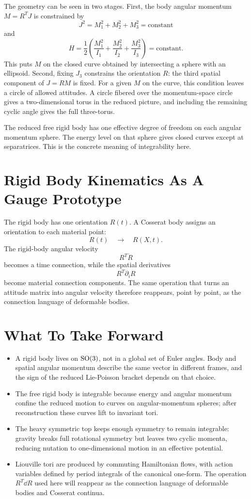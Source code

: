 The geometry can be seen in two stages. First, the body angular momentum
\(M=R^TJ\) is constrained by
\[
  J^2=M_1^2+M_2^2+M_3^2=\text{constant}
\]
and
\[
  H=\frac12\left(\frac{M_1^2}{I_1}
  +\frac{M_2^2}{I_2}
  +\frac{M_3^2}{I_3}\right)=\text{constant}.
\]
This puts \(M\) on the closed curve obtained by intersecting a sphere with an
ellipsoid. Second, fixing \(J_3\) constrains the orientation \(R\): the third
spatial component of \(J=RM\) is fixed. For a given \(M\) on the curve, this
condition leaves a circle of allowed attitudes. A circle fibered over the
momentum-space circle gives a two-dimensional torus in the reduced picture, and
including the remaining cyclic angle gives the full three-torus.

The reduced free rigid body has one effective degree of freedom on each angular
momentum sphere. The energy level on that sphere gives closed curves except at
separatrices. This is the concrete meaning of integrability here.

\section{Rigid Body Kinematics As A Gauge Prototype}
\label{sec:rigid-to-deforming}

The rigid body has one orientation \(R(t)\). A Cosserat body assigns an
orientation to each material point:
\[
  R(t)
  \quad\longrightarrow\quad
  R(X,t).
\]
The rigid-body angular velocity
\[
  R^T\dot R
\]
becomes a time connection, while the spatial derivatives
\[
  R^T\partial_iR
\]
become material connection components. The same operation that turns an attitude
matrix into angular velocity therefore reappears, point by point, as the
connection language of deformable bodies.

\section{What To Take Forward}
\label{sec:rigid-take-forward}

\begin{itemize}
\item A rigid body lives on \(\operatorname{SO}(3)\), not in a global set of Euler angles.
Body and spatial angular momentum describe the same vector in different frames,
and the sign of the reduced Lie-Poisson bracket depends on that choice.
\item The free rigid body is integrable because energy and angular momentum
confine the reduced motion to curves on angular-momentum spheres; after
reconstruction these curves lift to invariant tori.
\item The heavy symmetric top keeps enough symmetry to remain integrable:
gravity breaks full rotational symmetry but leaves two cyclic momenta, reducing
nutation to one-dimensional motion in an effective potential.
\item Liouville tori are produced by commuting Hamiltonian flows, with action
variables defined by period integrals of the canonical one-form. The operation
\(R^T\dd R\) used here will reappear as the connection language of deformable
bodies and Cosserat continua.
\end{itemize}

